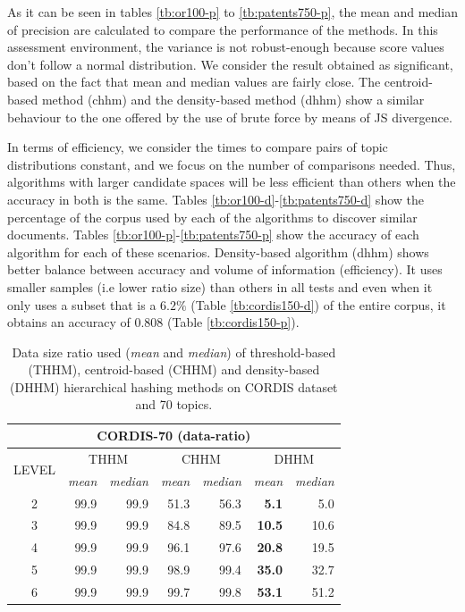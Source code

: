 As it can be seen in tables \ref{tb:or100-p} to \ref{tb:patents750-p}, the mean and median of precision are calculated to compare the performance of the methods. In this assessment environment, the variance is not robust-enough because score values don't follow a normal distribution. We consider the result obtained as significant, based on the fact that mean and median values are fairly close. The centroid-based method (chhm) and the density-based method (dhhm) show a similar behaviour to the one offered by the use of brute force by means of JS divergence. 

In terms of efficiency, we consider the times to compare pairs of topic distributions constant, and we focus on the number of comparisons needed. Thus, algorithms with larger candidate spaces will be less efficient than others when the accuracy in both is the same. Tables \ref{tb:or100-d}-\ref{tb:patents750-d} show the percentage of the corpus used by each of the algorithms to discover similar documents. Tables \ref{tb:or100-p}-\ref{tb:patents750-p} show the accuracy of each algorithm for each of these scenarios. Density-based algorithm (dhhm) shows better balance between accuracy and volume of information (efficiency). It uses smaller samples (i.e lower ratio size) than others in all tests and even when it only uses a subset that is a $6.2\%$ (Table \ref{tb:cordis150-d}) of the entire corpus, it obtains an accuracy of $0.808$ (Table \ref{tb:cordis150-p}).


\begin{table}\centering
  \scriptsize
  \begin{tabular}{c|rr||rr||rr}
    \multicolumn{7}{c}{CORDIS-70 (data-ratio)} \\
    \toprule
    \multirow{2}{*}{LEVEL} &
      \multicolumn{2}{c}{THHM} &
      \multicolumn{2}{c}{CHHM} &
      \multicolumn{2}{c}{DHHM} \\
      & {\textit{mean}} & {\textit{median}} & {\textit{mean}} & {\textit{median}} & {\textit{mean}} & {\textit{median}} \\
      \midrule
    2 & 99.9 & 99.9 & 51.3 & 56.3 & \textbf{5.1} & 5.0 \\
    3 & 99.9 & 99.9 & 84.8 & 89.5 & \textbf{10.5} & 10.6 \\
    4 & 99.9 & 99.9 & 96.1 & 97.6 & \textbf{20.8} & 19.5 \\
    5 & 99.9 & 99.9 & 98.9 & 99.4 & \textbf{35.0} & 32.7 \\
    6 & 99.9 & 99.9 & 99.7 & 99.8 & \textbf{53.1} & 51.2 \\
    \bottomrule
  \end{tabular}
\caption{Data size ratio used (\textit{mean} and \textit{median}) of threshold-based (THHM), centroid-based (CHHM) and density-based (DHHM) hierarchical hashing methods on CORDIS dataset and 70 topics.}
\label{tb:cordis70-d}
\end{table}

